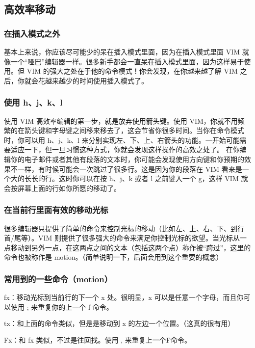 \documentclass[11pt]{article}
\begin{document}
\subsection{高效率移动}
\label{sec-12-5}
\subsubsection{在插入模式之外}
\label{sec-12-5-1}

    基本上来说，你应该尽可能少的呆在插入模式里面，因为在插入模式里面 VIM 就像一个“哑巴”编辑器一样。很多新手都会一直呆在插入模式里面，因为这样易于使用。但 VIM 的强大之处在于他的命令模式！你会发现，在你越来越了解 VIM 之后，你就会花越来越少的时间使用插入模式了。
\subsubsection{使用 h、j、k、l}
\label{sec-12-5-2}

    使用 VIM 高效率编辑的第一步，就是放弃使用箭头键。使用 VIM，你就不用频繁的在箭头键和字母键之间移来移去了，这会节省你很多时间。当你在命令模式时，你可以用 h、j、k、l 来分别实现左、下、上、右箭头的功能。一开始可能需要适应一下，但一旦习惯这种方式，你就会发现这样操作的高效之处了。
    在你编辑你的电子邮件或者其他有段落的文本时，你可能会发现使用方向键和你预期的效果不一样，有时候可能会一次跳过了很多行。这是因为你的段落在 VIM 看来是一个大的长长的行。这时你可以在按 h、j、k 或者 l 之前键入一个 g，这样 VIM 就会按屏幕上面的行如你所愿的移动了。
\subsubsection{在当前行里面有效的移动光标}
\label{sec-12-5-3}

    很多编辑器只提供了简单的命令来控制光标的移动（比如左、上、右、下、到行首/尾等）。VIM 则提供了很多强大的命令来满足你控制光标的欲望。当光标从一点移动到另外一点，在这两点之间的文本（包括这两个点）称作被“跨过”，这里的命令也被称作是 motion。（简单说明一下，后面会用到这个重要的概念）
\subsubsection{常用到的一些命令（motion）}
\label{sec-12-5-4}

    fx：移动光标到当前行的下一个 x 处。很明显，x 可以是任意一个字母，而且你可以使用 ; 来重复你的上一个 f 命令。

    tx：和上面的命令类似，但是是移动到 x 的左边一个位置。（这真的很有用）

    Fx：和 fx 类似，不过是往回找。使用 , 来重复上一个F命令。
\end{document}

